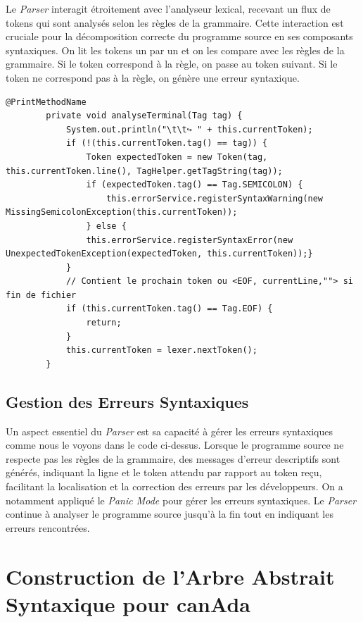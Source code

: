 \documentclass[french,a4paper]{article}
\begin{document}
    Le \textit{Parser} interagit étroitement avec l'analyseur lexical, recevant un flux de tokens qui sont analysés selon les règles de la grammaire.
    Cette interaction est cruciale pour la décomposition correcte du programme source en ses composants syntaxiques.
    On lit les tokens un par un et on les compare avec les règles de la grammaire.
    Si le token correspond à la règle, on passe au token suivant.
    Si le token ne correspond pas à la règle, on génère une erreur syntaxique.

    \begin{lstlisting}[label={lst:lstlisting11}]
        @PrintMethodName
        private void analyseTerminal(Tag tag) {
            System.out.println("\t\t↪️ " + this.currentToken);
            if (!(this.currentToken.tag() == tag)) {
                Token expectedToken = new Token(tag, this.currentToken.line(), TagHelper.getTagString(tag));
                if (expectedToken.tag() == Tag.SEMICOLON) {
                    this.errorService.registerSyntaxWarning(new MissingSemicolonException(this.currentToken));
                } else {
                this.errorService.registerSyntaxError(new UnexpectedTokenException(expectedToken, this.currentToken));}
            }
            // Contient le prochain token ou <EOF, currentLine,""> si fin de fichier
            if (this.currentToken.tag() == Tag.EOF) {
                return;
            }
            this.currentToken = lexer.nextToken();
        }
    \end{lstlisting}

    \subsection{Gestion des Erreurs Syntaxiques}\label{subsec:gestion-des-erreurs-syntaxiques}

    Un aspect essentiel du \textit{Parser} est sa capacité à gérer les erreurs syntaxiques comme nous le voyons dans le code ci-dessus.
    Lorsque le programme source ne respecte pas les règles de la grammaire, des messages d'erreur descriptifs sont générés, indiquant la ligne et le token attendu par rapport au token reçu, facilitant la localisation et la correction des erreurs par les développeurs.
    On a notamment appliqué le \textit{Panic Mode} pour gérer les erreurs syntaxiques.
    Le \textit{Parser} continue à analyser le programme source jusqu'à la fin tout en indiquant les erreurs rencontrées.

    \section{Construction de l'Arbre Abstrait Syntaxique pour canAda}\label{sec:construction-de-l'arbre-abstrait-syntaxique-pour-canada}
\end{document}
